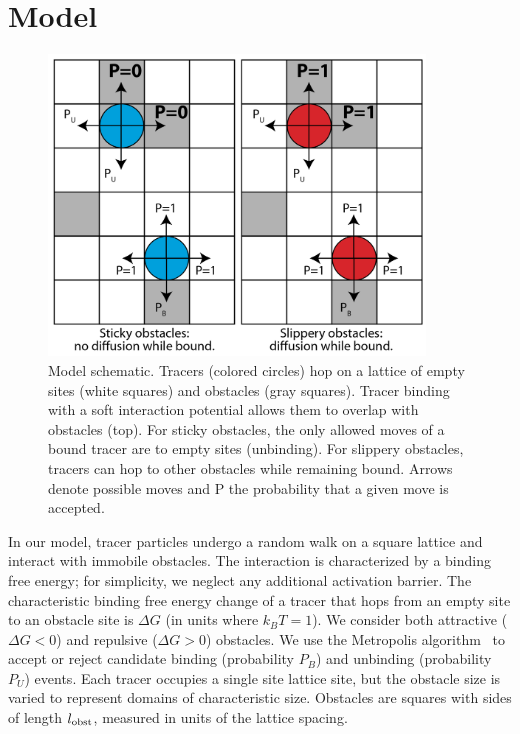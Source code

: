 \section{Model}
\begin{figure}[!ht]
  \begin{center}
    \includegraphics[width=100mm]{figs/ch02_soft/soft_model.png}
  \end{center}
	\caption[Soft sticky and slippery model schematic]
    {Model schematic. Tracers (colored circles) hop on a lattice
    of empty sites (white squares) and obstacles (gray
    squares). Tracer binding with a soft interaction potential allows
    them to overlap with obstacles (top). For sticky obstacles, the
    only allowed moves of a bound tracer are to empty sites
    (unbinding).  For slippery obstacles, tracers can hop to other
    obstacles while remaining bound.  Arrows denote possible moves and
    P the probability that a given move is accepted.}\label{fig:soft_model}
\end{figure}

In our model, tracer particles undergo a random walk on a square lattice and
interact with immobile obstacles. The interaction is characterized by a binding
free energy; for simplicity, we neglect any additional activation barrier.  The
characteristic binding free energy change of a tracer that hops from an empty
site to an obstacle site is $ \Delta G $ (in units where $k_B T = 1$).  We
consider both attractive ($ \Delta G < 0 $) and repulsive ($ \Delta G > 0 $)
obstacles. We use the Metropolis algorithm~\cite{metropolis_equation_53} to
accept or reject candidate binding (probability $P_B$) and unbinding
(probability $P_U$) events. Each tracer occupies a single site lattice site, but
the obstacle size is varied to represent domains of characteristic size.
Obstacles are squares with sides of length $l_{\rm obst}$, measured in units of
the lattice spacing.
 
